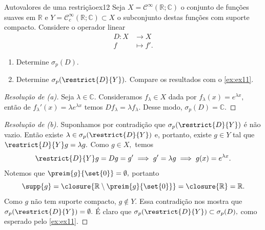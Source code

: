 \begin{exercício}{Autovalores de uma restrição}{ex12}
  Seja \(X = \mathcal{C}^\infty(\mathbb{R}; \mathbb{C})\) o conjunto de funções suaves em \(\mathbb{R}\) e \(Y = \mathcal{C}_c^\infty(\mathbb{R}; \mathbb{C})\subset X\) o subconjunto destas funções com suporte compacto. Considere o operador linear
  \begin{align*}
    D : X &\to X\\
        f &\mapsto f'.
  \end{align*}
  \begin{enumerate}[label=(\alph*)]
      \item Determine \(\sigma_p(D).\)
      \item Determine \(\sigma_p(\restrict{D}{Y}).\) Compare os resultados com o \cref{ex:ex11}.
  \end{enumerate}
\end{exercício}
\begin{proof}[Resolução de (a)]
  Seja \(\lambda \in \mathbb{C}.\) Consideramos \(f_\lambda \in X\) dada por \(f_\lambda(x) = e^{\lambda x},\) então de \(f_\lambda'(x) = \lambda e^{\lambda x}\) temos \(D f_\lambda = \lambda f_\lambda.\) Desse modo, \(\sigma_p(D) = \mathbb{C}.\)
\end{proof}
\begin{proof}[Resolução de (b)]
  Suponhamos por contradição que \(\sigma_p(\restrict{D}{Y})\) é não vazio. Então existe \(\lambda \in \sigma_p(\restrict{D}{Y})\) e, portanto, existe \(g \in Y\) tal que \(\restrict{D}{Y} g = \lambda g.\) Como \(g \in X,\) temos
  \begin{equation*}
    \restrict{D}{Y}g = Dg = g' \implies g' = \lambda g \implies g(x) = e^{\lambda x}.
  \end{equation*}
  Notemos que \(\preim{g}{\set{0}} = \emptyset,\) portanto
  \begin{equation*}
    \supp{g} = \closure{\mathbb{R} \setminus \preim{g}{\set{0}}} = \closure{\mathbb{R}} = \mathbb{R}.
  \end{equation*}
  Como \(g\) não tem suporte compacto, \(g \notin Y.\) Essa contradição nos mostra que \(\sigma_p(\restrict{D}{Y}) = \emptyset.\) É claro que \(\sigma_p(\restrict{D}{Y}) \subset \sigma_p(D),\) como esperado pelo \cref{ex:ex11}.
\end{proof}
